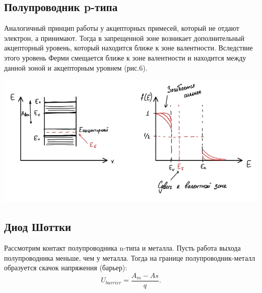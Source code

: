 \documentclass[a4paper]{article}
\begin{document}
\subsection*{Полупроводник p-типа}
Аналогичный принцип работы у акцепторных примесей, который не отдают электрон, а принимают. Тогда в запрещенной зоне возникает дополнительный акцепторный уровень, который находится ближе к зоне валентности. Вследствие этого уровень Ферми смещается ближе к зоне валентности и находится между данной зоной и акцепторным уровнем (рис.6).
\begin{center}
    \includegraphics[scale = 0.7]{p-type.jpg}
\end{center}
\subsection*{Диод Шоттки}
Рассмотрим контакт полупроводника n-типа и металла. Пусть работа выхода полупроводника меньше, чем у металла. Тогда на границе полупроводник-металл образуется скачок напряжения (барьер):
\begin{equation}
	U_{barrier} = \frac{A_{m}-A{s}}{q} .
\end{equation}
\end{document}
